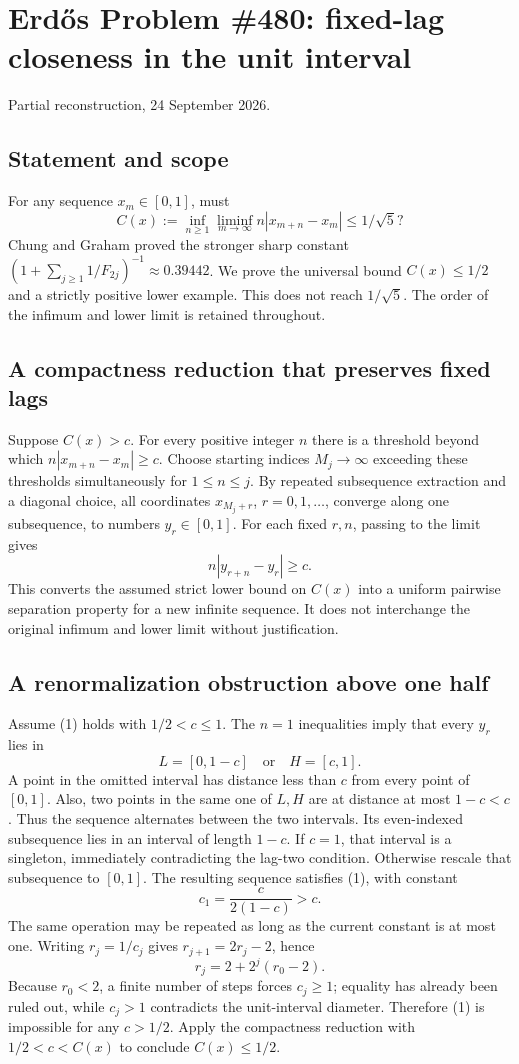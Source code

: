 \section{Erd\H{o}s Problem \#480: fixed-lag closeness in the unit interval}
\noindent Partial reconstruction, 24 September 2026.

\subsection*{Statement and scope}
For any sequence $x_m\in[0,1]$, must
\[C(x):=\inf_{n\ge1}\liminf_{m\to\infty}n|x_{m+n}-x_m|\le1/\sqrt5?\]
Chung and Graham proved the stronger sharp constant $(1+\sum_{j\ge1}1/F_{2j})^{-1}\approx0.39442$. We prove the universal bound $C(x)\le1/2$ and a strictly positive lower example. This does not reach $1/\sqrt5$. The order of the infimum and lower limit is retained throughout.

\subsection*{A compactness reduction that preserves fixed lags}
Suppose $C(x)>c$. For every positive integer $n$ there is a threshold beyond which $n|x_{m+n}-x_m|\ge c$. Choose starting indices $M_j\to\infty$ exceeding these thresholds simultaneously for $1\le n\le j$. By repeated subsequence extraction and a diagonal choice, all coordinates $x_{M_j+r}$, $r=0,1,\ldots$, converge along one subsequence, to numbers $y_r\in[0,1]$.
For each fixed $r,n$, passing to the limit gives
\[n|y_{r+n}-y_r|\ge c.\tag{1}\]
This converts the assumed strict lower bound on $C(x)$ into a uniform pairwise separation property for a new infinite sequence. It does not interchange the original infimum and lower limit without justification.

\subsection*{A renormalization obstruction above one half}
Assume (1) holds with $1/2<c\le1$. The $n=1$ inequalities imply that every $y_r$ lies in
\[L=[0,1-c]\quad\text{or}\quad H=[c,1].\]
A point in the omitted interval has distance less than $c$ from every point of $[0,1]$. Also, two points in the same one of $L,H$ are at distance at most $1-c<c$. Thus the sequence alternates between the two intervals. Its even-indexed subsequence lies in an interval of length $1-c$.
If $c=1$, that interval is a singleton, immediately contradicting the lag-two condition. Otherwise rescale that subsequence to $[0,1]$. The resulting sequence satisfies (1), with constant
\[c_1=\frac{c}{2(1-c)}>c.\]
The same operation may be repeated as long as the current constant is at most one. Writing $r_j=1/c_j$ gives $r_{j+1}=2r_j-2$, hence
\[r_j=2+2^j(r_0-2).\]
Because $r_0<2$, a finite number of steps forces $c_j\ge1$; equality has already been ruled out, while $c_j>1$ contradicts the unit-interval diameter. Therefore (1) is impossible for any $c>1/2$. Apply the compactness reduction with $1/2<c<C(x)$ to conclude $C(x)\le1/2$.

